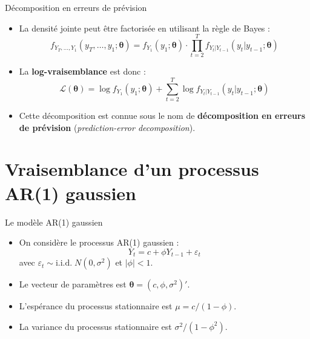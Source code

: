 \documentclass[11pt,aspectratio=169]{beamer}
\begin{document}
\begin{frame}{Décomposition en erreurs de prévision}

\begin{itemize}

\item La densité jointe peut être factorisée en utilisant la règle de Bayes :
  \[
  f_{Y_T, \ldots, Y_1}(y_T, \ldots, y_1; \bm{\theta}) = f_{Y_1}(y_1; \bm{\theta}) \cdot \prod_{t=2}^{T} f_{Y_t | Y_{t-1}}(y_t | y_{t-1}; \bm{\theta})
  \]\newline

\item La \textbf{log-vraisemblance} est donc :
  \[
  \mathcal{L}(\bm{\theta}) = \log f_{Y_1}(y_1; \bm{\theta}) + \sum_{t=2}^{T} \log f_{Y_t | Y_{t-1}}(y_t | y_{t-1}; \bm{\theta})
  \]\newline

\item Cette décomposition est connue sous le nom de \textbf{décomposition en erreurs de prévision} (\emph{prediction-error decomposition}).

\end{itemize}

\end{frame}

\section{Vraisemblance d'un processus AR(1) gaussien}

\begin{frame}{Le modèle AR(1) gaussien}

\begin{itemize}

\item On considère le processus AR(1) gaussien :
  \[
  Y_t = c + \phi Y_{t-1} + \varepsilon_t
  \]
  avec $\varepsilon_t \sim \text{i.i.d.} \; N(0, \sigma^2)$ et $|\phi| < 1$.\newline

\item Le vecteur de paramètres est $\bm{\theta} = (c, \phi, \sigma^2)'$.\newline

\item L'espérance du processus stationnaire est $\mu = c/(1 - \phi)$.\newline

\item La variance du processus stationnaire est $\sigma^2/(1 - \phi^2)$.

\end{itemize}

\end{frame}
\end{document}
